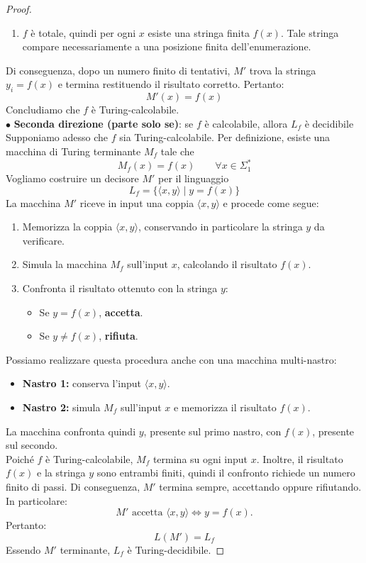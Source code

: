 \begin{proof}
\begin{enumerate}
    \item $f$ è totale, quindi per ogni $x$ esiste
    una stringa finita $f(x)$.
    Tale stringa compare necessariamente
    a una posizione finita dell'enumerazione.
\end{enumerate}
Di conseguenza, dopo un numero finito di tentativi, $M'$ trova la stringa $y_i=f(x)$ e termina restituendo il risultato corretto.
Pertanto:
\[ \boxed{M'(x)=f(x)} \]
Concludiamo che $f$ è Turing-calcolabile.\medskip\\


\noindent $\bullet$ \textbf{Seconda direzione (parte solo se)}: se $f$ è calcolabile, allora $L_f$ è decidibile\smallskip\\
Supponiamo adesso che $f$ sia Turing-calcolabile. Per definizione, esiste una macchina di Turing
terminante $M_f$ tale che
\[ M_f(x)=f(x) \qquad \forall x\in\Sigma_1^*\]
Vogliamo costruire un decisore $M'$ per il linguaggio
\[   L_f=\{\langle x,y\rangle\mid y=f(x)\}  \]
La macchina $M'$ riceve in input una coppia $\langle x,y\rangle$ e procede come segue:
\begin{enumerate}
    \item Memorizza la coppia $\langle x,y\rangle$,
    conservando in particolare la stringa $y$
    da verificare.

    \item Simula la macchina $M_f$ sull'input $x$,
    calcolando il risultato $f(x)$.

    \item Confronta il risultato ottenuto con la
    stringa $y$:
    \begin{itemize} [label = --]
        \item Se $y=f(x)$, \textbf{accetta}.
        \item Se $y\neq f(x)$, \textbf{rifiuta}.
    \end{itemize}
\end{enumerate}
Possiamo realizzare questa procedura anche con
una macchina multi-nastro:

\begin{itemize}[label = --]
    \item \textbf{Nastro 1:} conserva l'input
    $\langle x,y\rangle$.

    \item \textbf{Nastro 2:} simula $M_f$ sull'input
    $x$ e memorizza il risultato $f(x)$.
\end{itemize}
La macchina confronta quindi $y$, presente sul primo nastro, con $f(x)$, presente sul secondo.\\
Poiché $f$ è Turing-calcolabile, $M_f$ termina su ogni input $x$.
Inoltre, il risultato $f(x)$ e la stringa $y$ sono entrambi finiti, quindi il confronto richiede un numero finito di passi.
Di conseguenza, $M'$ termina sempre, accettando oppure rifiutando. In particolare:
\[ M'\text{ accetta }\langle x,y\rangle \iff y=f(x). \]
Pertanto:
\[ \boxed{L(M')=L_f} \]
Essendo $M'$ terminante, $L_f$ è Turing-decidibile.



\end{proof}
